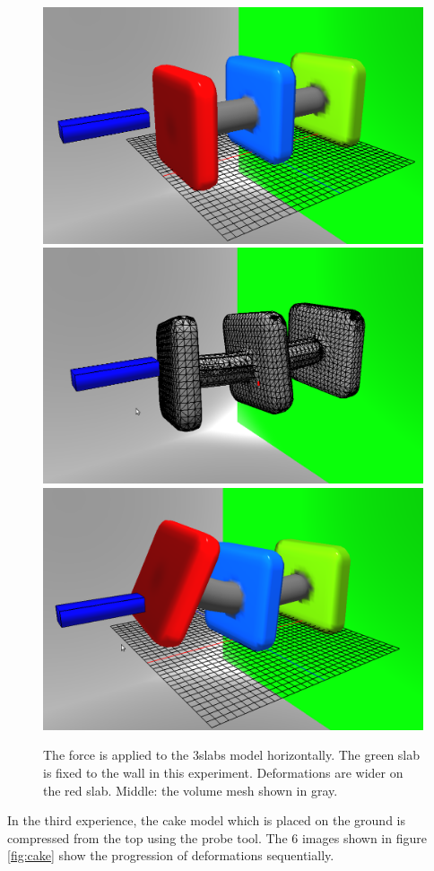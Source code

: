 \begin{figure}[H]
  \centering
  \includegraphics[width=0.30\linewidth]{figures/deformable/shots/3slabs01.png}
  \includegraphics[width=0.30\linewidth]{figures/deformable/shots/3slabs02.png}
  \includegraphics[width=0.30\linewidth]{figures/deformable/shots/3slabs03.png}
 
  \caption{\label{fig:3slabs}
  {The force is applied to the 3slabs model horizontally. The green slab is fixed to the wall in this experiment.
  Deformations are wider on the red slab. Middle: the volume mesh shown in gray.}
}
\end{figure}

In the third experience, the cake model which is placed on the ground is compressed from the top 
using the probe tool. The 6 images shown in figure \ref{fig:cake} show the progression of deformations 
sequentially.

